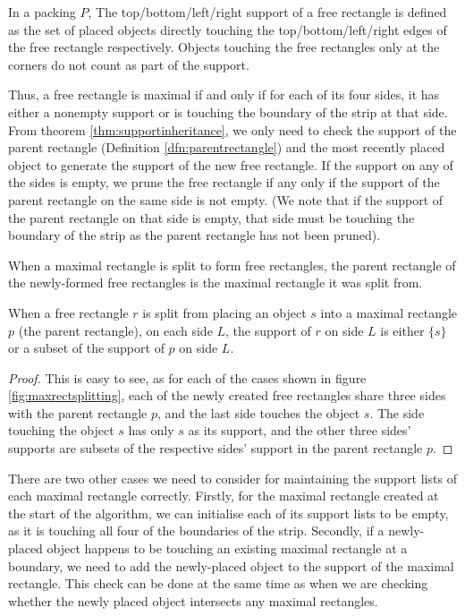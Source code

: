 \documentclass{article}
\begin{document}
\begin{defn}
\begin{defn}
\begin{dfn}
In a packing $P$, The top/bottom/left/right support of a free rectangle is defined as the set of placed objects directly touching the top/bottom/left/right edges of the free rectangle respectively. Objects touching the free rectangles only at the corners do not count as part of the support.
\begin{dfn}

Thus, a free rectangle is maximal if and only if for each of its four sides, it has either a nonempty support or is touching the boundary of the strip at that side. From theorem \ref{thm:supportinheritance}, we only need to check the support of the parent rectangle (Definition \ref{dfn:parentrectangle}) and the most recently placed object to generate the support of the new free rectangle. If the support on any of the sides is empty, we prune the free rectangle if any only if the support of the parent rectangle on the same side is not empty. (We note that if the support of the parent rectangle on that side is empty, that side must be touching the boundary of the strip as the parent rectangle has not been pruned).

\begin{dfn}
\label{dfn:parentrectangle}
When a maximal rectangle is split to form free rectangles, the parent rectangle of the newly-formed free rectangles is the maximal rectangle it was split from.
\end{dfn}

\begin{thm}
\label{thm:supportinheritance}
When a free rectangle $r$ is split from placing an object $s$ into a maximal rectangle $p$ (the parent rectangle), on each side $L$, the support of $r$ on side $L$ is either $\{s\}$ or a subset of the support of $p$ on side $L$.
\end{thm}
\begin{proof}
This is easy to see, as for each of the cases shown in figure \ref{fig:maxrectsplitting}, each of the newly created free rectangles share three sides with the parent rectangle $p$, and the last side touches the object $s$. The side touching the object $s$ has only $s$ as its support, and the other three sides' supports are subsets of the respective sides' support in the parent rectangle $p$.
\end{proof}

There are two other cases we need to consider for maintaining the support lists of each maximal rectangle correctly. Firstly, for the maximal rectangle created at the start of the algorithm, we can initialise each of its support lists to be empty, as it is touching all four of the boundaries of the strip. Secondly, if a newly-placed object happens to be touching an existing maximal rectangle at a boundary, we need to add the newly-placed object to the support of the maximal rectangle. This check can be done at the same time as when we are checking whether the newly placed object intersects any maximal rectangles.\\


\end{dfn}
\end{dfn}
\end{defn}
\end{defn}
\end{document}
